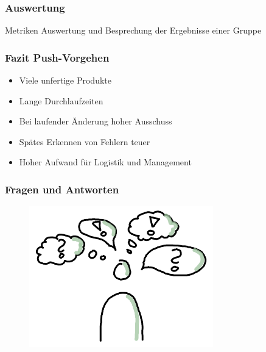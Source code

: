 \begin{frame}
	\frametitle{Auswertung}
	\begin{exampleblock}{Metriken}
		Auswertung und Besprechung der Ergebnisse einer Gruppe
	\end{exampleblock}
\end{frame}
\begin{frame}
	\frametitle{Fazit Push-Vorgehen}
	\begin{itemize}[<+->]
		\item Viele unfertige Produkte
		\item Lange Durchlaufzeiten
		\item Bei laufender Änderung hoher Ausschuss
		\item Spätes Erkennen von Fehlern teuer
		\item Hoher Aufwand für Logistik und Management
	\end{itemize}
\end{frame}
\begin{frame}
	\frametitle{Fragen und Antworten}
	\begin{figure}[ht]
		\includegraphics[width=8.0cm]{Bilder/fragenantwort.png}
	\end{figure}
\end{frame}